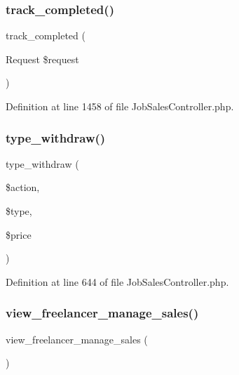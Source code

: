 \subsubsection{\texorpdfstring{track\_completed()}{track\_completed()}}
{\footnotesize\ttfamily track\+\_\+completed (\begin{DoxyParamCaption}\item[{Request}]{\$request }\end{DoxyParamCaption})\hspace{0.3cm}{\ttfamily [protected]}}



Definition at line 1458 of file Job\+Sales\+Controller.\+php.

\mbox{\label{class_responsive_1_1_http_1_1_controllers_1_1_job_sales_controller_a312ebafadbee3f2196f02445219f3c66}} 
\subsubsection{\texorpdfstring{type\_withdraw()}{type\_withdraw()}}
{\footnotesize\ttfamily type\+\_\+withdraw (\begin{DoxyParamCaption}\item[{}]{\$action,  }\item[{}]{\$type,  }\item[{}]{\$price }\end{DoxyParamCaption})}



Definition at line 644 of file Job\+Sales\+Controller.\+php.

\mbox{\label{class_responsive_1_1_http_1_1_controllers_1_1_job_sales_controller_a06fea9782c9683f602d3e9b2711b0b9a}} 
\subsubsection{\texorpdfstring{view\_freelancer\_manage\_sales()}{view\_freelancer\_manage\_sales()}}
{\footnotesize\ttfamily view\+\_\+freelancer\+\_\+manage\+\_\+sales (\begin{DoxyParamCaption}{ }\end{DoxyParamCaption})}



